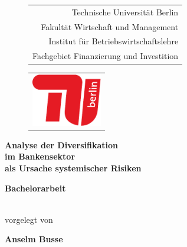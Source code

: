 

\begin{titlepage}
	\singlespacing{} \sffamily

	\begin{figure} \sffamily
		\begin{flushright}
			\begin{tabular}[m]{r}
				Technische Universität Berlin           \\
				Fakultät Wirtschaft und Management      \\
				Institut für Betriebswirtschaftslehre   \\
				Fachgebiet Finanzierung und Investition \\
			\end{tabular}%
			\begin{tabular}[m]{c}
				\includegraphics[height=65pt]{figures/tu-logo}
			\end{tabular}
		\end{flushright}
	\end{figure}

	\begin{center}
		\rule{0pt}{0pt}
		\vfill
		\vfill

		\begin{Huge}
			\bf\sffamily
			Analyse der Diversifikation\\[0.5ex]
			im Bankensektor\\[0.5ex]
			als Ursache systemischer Risiken\\[0.5ex]
		\end{Huge}

		\vfill
		\vfill

		\begin{LARGE}
			\bf\sffamily
			Bachelorarbeit
		\end{LARGE} \\
		\vspace{.5cm}
		vorgelegt von \\
		\vspace{.5cm}
		\begin{Large}
			\bf\sffamily
			Anselm Busse
		\end{Large} \\ \vspace{.25cm}


\end{center}
\end{titlepage}
